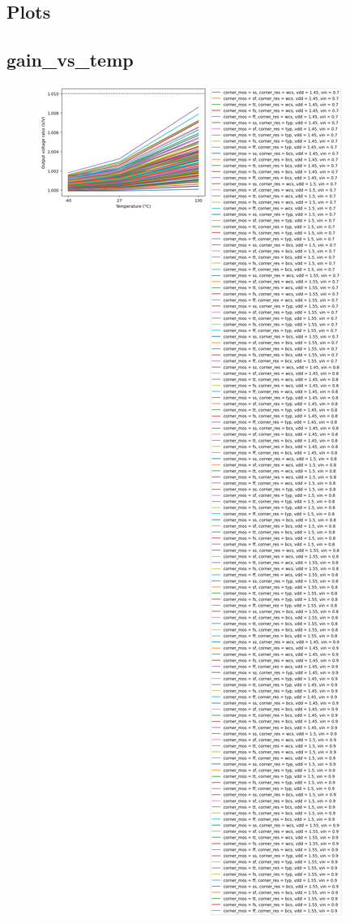 \documentclass[
  a4paper,
  DIV=11,
  numbers=noendperiod]{scrartcl}
\begin{document}
\begin{tcolorbox}
\subsection*{Plots}\label{plots-1}

\subsection*{gain\_vs\_temp}\label{gain_vs_temp-1}

\begin{figure}[H]

{\centering \includegraphics{./cace/_docs/ota-improved/schematic/gain_vs_temp.png}

}
\end{figure}
\end{tcolorbox}
\end{document}
